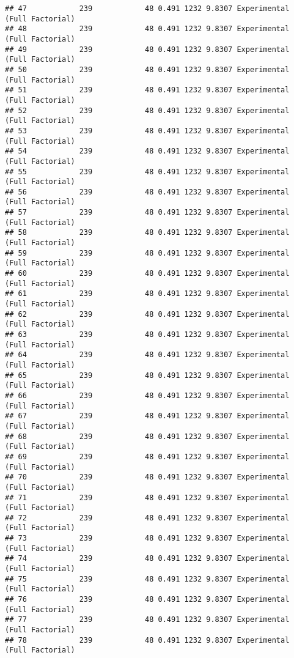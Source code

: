 \documentclass[]{article}
\begin{document}
\begin{verbatim}
## 47            239            48 0.491 1232 9.8307 Experimental (Full Factorial)
## 48            239            48 0.491 1232 9.8307 Experimental (Full Factorial)
## 49            239            48 0.491 1232 9.8307 Experimental (Full Factorial)
## 50            239            48 0.491 1232 9.8307 Experimental (Full Factorial)
## 51            239            48 0.491 1232 9.8307 Experimental (Full Factorial)
## 52            239            48 0.491 1232 9.8307 Experimental (Full Factorial)
## 53            239            48 0.491 1232 9.8307 Experimental (Full Factorial)
## 54            239            48 0.491 1232 9.8307 Experimental (Full Factorial)
## 55            239            48 0.491 1232 9.8307 Experimental (Full Factorial)
## 56            239            48 0.491 1232 9.8307 Experimental (Full Factorial)
## 57            239            48 0.491 1232 9.8307 Experimental (Full Factorial)
## 58            239            48 0.491 1232 9.8307 Experimental (Full Factorial)
## 59            239            48 0.491 1232 9.8307 Experimental (Full Factorial)
## 60            239            48 0.491 1232 9.8307 Experimental (Full Factorial)
## 61            239            48 0.491 1232 9.8307 Experimental (Full Factorial)
## 62            239            48 0.491 1232 9.8307 Experimental (Full Factorial)
## 63            239            48 0.491 1232 9.8307 Experimental (Full Factorial)
## 64            239            48 0.491 1232 9.8307 Experimental (Full Factorial)
## 65            239            48 0.491 1232 9.8307 Experimental (Full Factorial)
## 66            239            48 0.491 1232 9.8307 Experimental (Full Factorial)
## 67            239            48 0.491 1232 9.8307 Experimental (Full Factorial)
## 68            239            48 0.491 1232 9.8307 Experimental (Full Factorial)
## 69            239            48 0.491 1232 9.8307 Experimental (Full Factorial)
## 70            239            48 0.491 1232 9.8307 Experimental (Full Factorial)
## 71            239            48 0.491 1232 9.8307 Experimental (Full Factorial)
## 72            239            48 0.491 1232 9.8307 Experimental (Full Factorial)
## 73            239            48 0.491 1232 9.8307 Experimental (Full Factorial)
## 74            239            48 0.491 1232 9.8307 Experimental (Full Factorial)
## 75            239            48 0.491 1232 9.8307 Experimental (Full Factorial)
## 76            239            48 0.491 1232 9.8307 Experimental (Full Factorial)
## 77            239            48 0.491 1232 9.8307 Experimental (Full Factorial)
## 78            239            48 0.491 1232 9.8307 Experimental (Full Factorial)

\end{verbatim}
\end{document}
